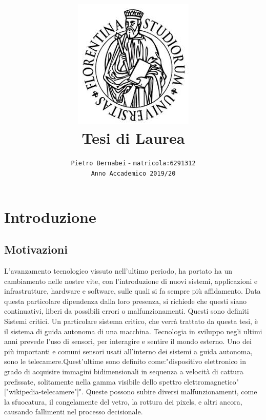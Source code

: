 \documentclass[14pt]{extarticle}
\begin{document}
\title{\includegraphics{download.jpeg} \vspace{2cm} \textbf{\\Tesi di Laurea}}

\author{\texttt{Pietro Bernabei} - \texttt{matricola:6291312}\\ \texttt{Anno Accademico 2019/20}}
\date{}
\maketitle
\newpage
\tableofcontents

\newpage
\section{Introduzione}
\subsection{Motivazioni}
L'avanzamento tecnologico vissuto nell'ultimo periodo,  ha portato ha un cambiamento nelle nostre vite, con l'introduzione di nuovi sistemi, applicazioni e infrastrutture, hardware e software, sulle quali si fa sempre più affidamento.
Data questa particolare dipendenza dalla loro presenza, si richiede che questi siano continuativi, liberi da possibili errori o malfunzionamenti. Questi sono definiti Sistemi critici.
Un particolare sistema critico, che verrà trattato da questa tesi, è il sistema di guida autonoma di una macchina.
Tecnologia in sviluppo negli ultimi anni prevede l'uso di sensori, per interagire e sentire il mondo esterno. Uno dei più importanti e comuni sensori usati all'interno dei sistemi a guida autonoma, sono le telecamere.Quest'ultime sono definito come:"dispositivo elettronico in grado di acquisire immagini bidimensionali in sequenza a velocità di cattura prefissate, solitamente nella gamma visibile dello spettro elettromagnetico"["wikipedia-telecamere"]". Queste possono subire diversi malfunzionamenti, come la sfuocatura, il congelamente del vetro, la rottura dei pixels, e altri ancora, causando fallimenti nel processo decisionale.
\end{document}
